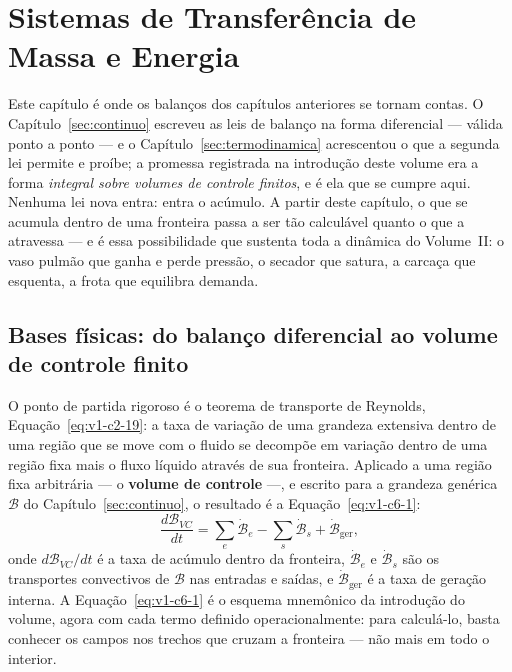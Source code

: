 \documentclass[12pt,a4paper]{article}
\numberwithin{equation}{section}
\numberwithin{table}{section}
\numberwithin{figure}{section}
\begin{document}
\section{Sistemas de Transferência de Massa e Energia}\label{sec:sistemas}

Este capítulo é onde os balanços dos capítulos anteriores se tornam contas.
O Capítulo~\ref{sec:continuo} escreveu as leis de balanço na forma diferencial
--- válida ponto a ponto --- e o Capítulo~\ref{sec:termodinamica} acrescentou
o que a segunda lei permite e proíbe; a promessa registrada na introdução
deste volume era a forma \emph{integral sobre volumes de controle finitos}, e
é ela que se cumpre aqui. Nenhuma lei nova entra: entra o acúmulo. A partir
deste capítulo, o que se acumula dentro de uma fronteira passa a ser tão
calculável quanto o que a atravessa --- e é essa possibilidade que sustenta
toda a dinâmica do Volume~II: o vaso pulmão que ganha e perde pressão, o
secador que satura, a carcaça que esquenta, a frota que equilibra demanda.

\subsection{Bases físicas: do balanço diferencial ao volume de controle
finito}\label{sub:v1-c6-bases}

O ponto de partida rigoroso é o teorema de transporte de Reynolds,
Equação~\eqref{eq:v1-c2-19}: a taxa de variação de uma grandeza extensiva
dentro de uma região que se move com o fluido se decompõe em variação dentro
de uma região fixa mais o fluxo líquido através de sua fronteira. Aplicado a
uma região fixa arbitrária --- o \textbf{volume de controle} ---, e escrito
para a grandeza genérica $\mathcal{B}$ do Capítulo~\ref{sec:continuo}, o
resultado é a Equação~\eqref{eq:v1-c6-1}:
\begin{equation}\label{eq:v1-c6-1}
\frac{d\mathcal{B}_{VC}}{dt} = \sum_e \dot{\mathcal{B}}_e -
\sum_s \dot{\mathcal{B}}_s + \dot{\mathcal{B}}_{\text{ger}} ,
\end{equation}
onde $d\mathcal{B}_{VC}/dt$ é a taxa de acúmulo dentro da fronteira,
$\dot{\mathcal{B}}_e$ e $\dot{\mathcal{B}}_s$ são os transportes convectivos
de $\mathcal{B}$ nas entradas e saídas, e $\dot{\mathcal{B}}_{\text{ger}}$ é a
taxa de geração interna. A Equação~\eqref{eq:v1-c6-1} é o esquema mnemônico da
introdução do volume, agora com cada termo definido operacionalmente: para
calculá-lo, basta conhecer os campos nos trechos que cruzam a fronteira --- não
mais em todo o interior.
\end{document}
